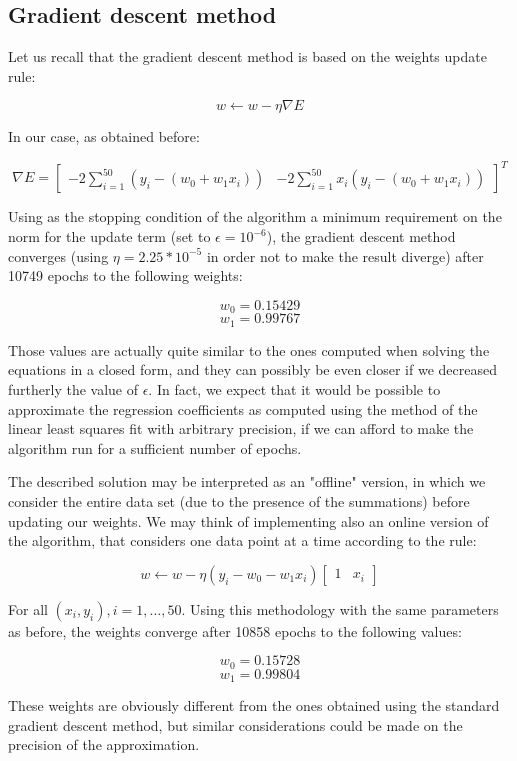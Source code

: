 \documentclass[letterpaper,headings=standardclasses]{scrartcl}
\begin{document}
\subsection{Gradient descent method}

Let us recall that the gradient descent method is based on the weights update rule:

$$ w \leftarrow w - \eta \nabla E $$

In our case, as obtained before:

$$ \nabla E = \left[ \begin{matrix} -2 \sum_{i = 1}^{50} (y_i - (w_0 + w_1 x_i)) & -2 \sum_{i = 1}^{50} x_i (y_i - (w_0 + w_1 x_i)) \end{matrix} \right]^T $$

Using as the stopping condition of the algorithm a minimum requirement on the norm for the update term (set to $\epsilon = 10^{-6}$), the gradient descent method converges (using $\eta = 2.25 * 10^{-5}$ in order not to make the result diverge) after 10749 epochs to the following weights:

$$ w_0 = 0.15429 $$
$$ w_1 = 0.99767 $$

Those values are actually quite similar to the ones computed when solving the equations in a closed form, and they can possibly be even closer if we decreased furtherly the value of $\epsilon$. In fact, we expect that it would be possible to approximate the regression coefficients as computed using the method of the linear least squares fit with arbitrary precision, if we can afford to make the algorithm run for a sufficient number of epochs.

The described solution may be interpreted as an "offline" version, in which we consider the entire data set (due to the presence of the summations) before updating our weights. We may think of implementing also an online version of the algorithm, that considers one data point at a time according to the rule:

$$ w \leftarrow w - \eta (y_i - w_0 - w_1 x_i) \left[ \begin{matrix} 1 & x_i \end{matrix} \right] $$

For all $(x_i,y_i), i = 1, \dots, 50$. Using this methodology with the same parameters as before, the weights converge after 10858 epochs to the following values:

$$ w_0 = 0.15728 $$
$$ w_1 = 0.99804 $$

These weights are obviously different from the ones obtained using the standard gradient descent method, but similar considerations could be made on the precision of the approximation.
\end{document}
